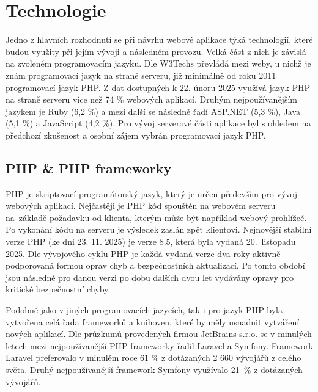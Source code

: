 \section{Technologie}
Jedno z hlavních rozhodnutí se při návrhu webové aplikace týká technologií, které budou využity při jejím vývoji a následném provozu. Velká část z nich je závislá na zvoleném programovacím jazyku. Dle W3Techs převládá mezi weby, u nichž je znám programovací jazyk na straně serveru, již minimálně od roku 2011 programovací jazyk PHP. Z dat dostupných k 22. únoru 2025 využívá jazyk PHP na straně serveru více než 74 \% webových aplikací. Druhým nejpoužívanějším jazykem je Ruby (6,2 \%) a mezi další se následně řadí ASP.NET (5,3 \%), Java (5,1 \%) a JavaScript (4,2 \%). \cite{php-w3techs} Pro vývoj serverové části aplikace byl s ohledem na předchozí zkušenost a osobní zájem vybrán programovací jazyk PHP.

\subsection{PHP \& PHP frameworky}
PHP je skriptovací programátorský jazyk, který je určen především pro vývoj webových aplikací. Nejčastěji je PHP kód spouštěn na webovém serveru na~základě požadavku od klienta, kterým může být například webový prohlížeč. Po vykonání kódu na serveru je výsledek zaslán zpět klientovi. \cite{php} Nejnovější stabilní verze PHP (ke dni 23. 11. 2025) je verze 8.5, která byla vydaná 20.~listopadu 2025. Dle vývojového cyklu PHP je každá vydaná verze dva roky aktivně podporovaná formou oprav chyb a bezpečnostních aktualizací. Po tomto období jsou následně pro danou verzi po dobu dalších dvou let vydávány opravy pro kritické bezpečnostní chyby. \cite{php-version}
 
Podobně jako v jiných programovacích jazycích, tak i pro jazyk PHP byla vytvořena celá řada frameworků a knihoven, které by měly usnadnit vytváření nových aplikací. Dle průzkumů provedených firmou JetBrains s.r.o. se v minulých letech mezi nejpoužívanější PHP frameworky řadil Laravel a Symfony. Framework Laravel preferovalo v minulém roce 61 \% z dotázaných 2 660 vývojářů z celého světa. Druhý nejpoužívanější framework Symfony využívalo 21~\% z dotázaných vývojářů. \cite{php-jetbrains}

